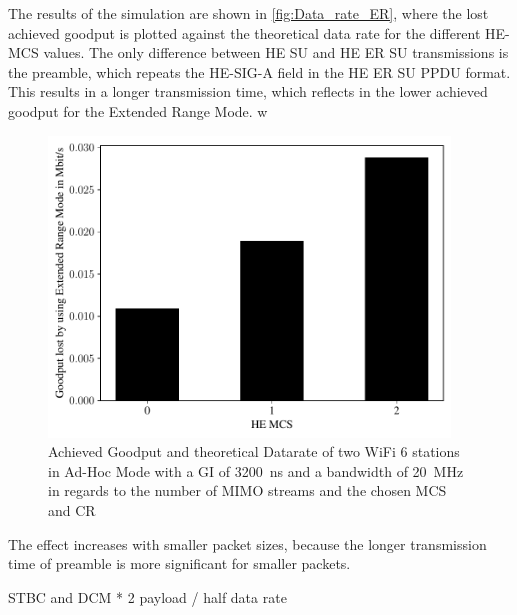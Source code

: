 The results of the simulation are shown in \autoref{fig:Data_rate_ER}, where the lost achieved goodput is plotted against the theoretical data rate for the different HE-\ac{MCS} values.
The only difference between HE SU and HE ER SU transmissions is the preamble, which repeats the HE-SIG-A field in the HE ER SU PPDU format.
This results in a longer transmission time, which reflects in the lower achieved goodput for the Extended Range Mode.
w
\begin{figure}[H]%
	\centering
	\includegraphics[width=0.95\textwidth]{figures/ER_dataRate_simulation.pdf}
	\caption{Achieved Goodput and theoretical Datarate of two WiFi 6 stations in Ad-Hoc Mode with a \ac{GI} of \SI{3200}{\nano\second} and a bandwidth of \SI{20}{\mega\hertz} in regards to the number of \ac{MIMO} streams and the chosen \ac{MCS} and \ac{CR}}%
	\label{fig:Data_rate_ER}%
\end{figure}
The effect increases with smaller packet sizes, because the longer transmission time of preamble is more significant for smaller packets.


STBC and DCM * 2 payload / half data rate

